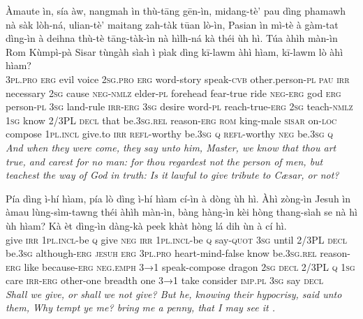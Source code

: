 \documentclass[11pt,a4paper]{article}
\begin{document}
\begin{exe}
\gll Àmaute ìn, sía àw, nangmah ìn thù-tāng gēn-ìn, midang-tè' pau dìng phamawh nà sàk lòh-ná, ulian-tè' maitang zah-tàk tūan lò-ìn, Pasian ìn mì-tè à gàm-tat dìng-ìn à deihna thù-tè tāng-tàk-ìn nà hìlh-ná kà théi ùh hì. Túa àhìh màn-ìn Rom Kùmpì-pà Sisar tùngàh sìah ì pìak dìng kī-lawm àhì hìam, kī-lawm lò àhì hìam? \\
     \textsc{3pl}.\textsc{pro} \textsc{erg} evil voice \textsc{2sg}.\textsc{pro} \textsc{erg} word-story speak-\textsc{cvb} other.person-\textsc{pl} \textsc{pau} \textsc{irr} necessary \textsc{2sg} cause \textsc{neg}-\textsc{nmlz} elder-\textsc{pl} forehead fear-true ride \textsc{neg}-\textsc{erg} god \textsc{erg} person-\textsc{pl} \textsc{3sg} land-rule \textsc{irr}-\textsc{erg} \textsc{3sg} desire word-\textsc{pl} reach-true-\textsc{erg} \textsc{2sg} teach-\textsc{nmlz} \textsc{1sg} know 2/3PL \textsc{decl} that be.\textsc{3sg}.\textsc{rel} reason-\textsc{erg} \textsc{rom} king-male \textsc{sisar} on-\textsc{loc} compose \textsc{1pl}.\textsc{incl} give.to \textsc{irr} \textsc{refl}-worthy be.\textsc{3sg} \textsc{q} \textsc{refl}-worthy \textsc{neg} be.\textsc{3sg} \textsc{q} \\
\glt \textcolor{kjvcolor}{\textit{And when they were come, they say unto him, Master, we know that thou art true, and carest for no man: for thou regardest not the person of men, but teachest the way of God in truth: Is it lawful to give tribute to Cæsar, or not?}}

\gll Pía dìng ì-hí hìam, pía lò dìng ì-hí hìam cí-ìn à dòng ùh hì. Àhì zòng-ìn Jesuh ìn àmau lùng-sìm-tawng théi àhìh màn-ìn, bàng hàng-ìn kèi hòng thang-sìah se nà hì ùh hìam? Kà èt dìng-ìn dàng-kà peek khàt hòng lá dih ùn à cí hì. \\
     give \textsc{irr} \textsc{1pl}.\textsc{incl}-be \textsc{q} give \textsc{neg} \textsc{irr} \textsc{1pl}.\textsc{incl}-be \textsc{q} say-\textsc{quot} \textsc{3sg} until 2/3PL \textsc{decl} be.\textsc{3sg} although-\textsc{erg} \textsc{jesuh} \textsc{erg} \textsc{3pl}.\textsc{pro} heart-mind-false know be.\textsc{3sg}.\textsc{rel} reason-\textsc{erg} like because-\textsc{erg} \textsc{neg}.\textsc{emph} \textsc{3→1} speak-compose dragon \textsc{2sg} \textsc{decl} 2/3PL \textsc{q} \textsc{1sg} care \textsc{irr}-\textsc{erg} other-one breadth one \textsc{3→1} take consider \textsc{imp}.\textsc{pl} \textsc{3sg} say \textsc{decl} \\
\glt \textcolor{kjvcolor}{\textit{Shall we give, or shall we not give? But he, knowing their hypocrisy, said unto them, Why tempt ye me? bring me a penny, that I may see it .}}


\end{exe}
\end{document}
